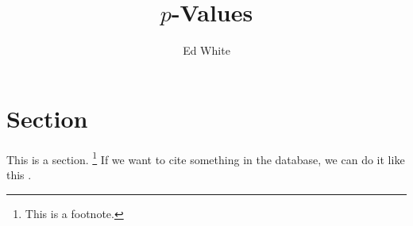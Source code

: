 \documentclass{tufte-handout}
\title{$p$-Values}
\author{Ed White}
\date{}
\theoremstyle{plain}
\theoremstyle{definition}
\begin{document}
\maketitle

\section{Section}

This is a section. \footnote{This is a footnote.}
If we want to cite something in the database, we can do it like this \cite{resnick2019probability}.



\end{document}
